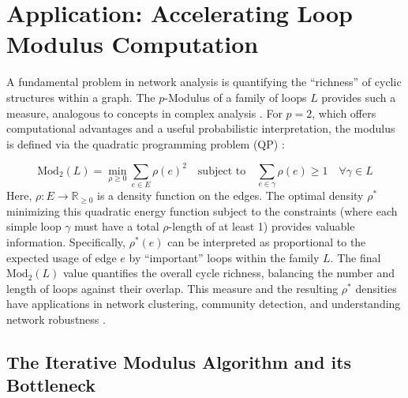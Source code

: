 \documentclass{article}
\begin{document}
\section{Application: Accelerating Loop Modulus Computation}
\label{sec:loop_modulus_app}
A fundamental problem in network analysis is quantifying the ``richness'' of cyclic structures within a graph. The $p$-Modulus of a family of loops $L$ provides such a measure, analogous to concepts in complex analysis \cite{albin2016minimal}. For $p=2$, which offers computational advantages and a useful probabilistic interpretation, the modulus is defined via the quadratic programming problem (QP) \cite{shakeri2017network}:

\begin{equation}
\label{eq:modulus_primal}
\text{Mod}_2(L) = \min_{\rho \ge 0} \sum_{e \in E} \rho(e)^2 \quad \text{subject to} \quad \sum_{e \in \gamma} \rho(e) \ge 1 \quad \forall \gamma \in L
\end{equation}
Here, $\rho: E \to \mathbb{R}_{\ge 0}$ is a density function on the edges. The optimal density $\rho^*$ minimizing this quadratic energy function subject to the constraints (where each simple loop $\gamma$ must have a total $\rho$-length of at least 1) provides valuable information. Specifically, $\rho^*(e)$ can be interpreted as proportional to the expected usage of edge $e$ by ``important'' loops within the family $L$. The final $\text{Mod}_2(L)$ value quantifies the overall cycle richness, balancing the number and length of loops against their overlap. This measure and the resulting $\rho^*$ densities have applications in network clustering, community detection, and understanding network robustness \cite{shakeri2017network}.

\subsection{The Iterative Modulus Algorithm and its Bottleneck}
\label{subsec:modulus_algo_bottleneck}
\end{document}
